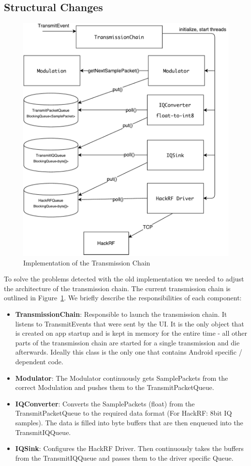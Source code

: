 \subsection{Structural Changes}
\begin{figure}
	\centering
	\includegraphics[width=0.8\linewidth]{gfx/feature1_design.pdf}
	\caption{Implementation of the Transmission Chain}
	\label{fig:impl:transmissionchain}
\end{figure}
To solve the problems detected with the old implementation we needed to adjust the architecture of the transmission chain. The current transmission chain is outlined in Figure~\ref{fig:impl:transmissionchain}. We briefly describe the responsibilities of each component: 

\begin{itemize}
	\item \textbf{TransmissionChain}: Responsible to launch the transmission chain. It listens to TransmitEvents that were sent by the UI. It is the only object that is created on app startup and is kept in memory for the entire time - all other parts of the transmission chain are started for a single transmission and die afterwards. Ideally this class is the only one that contains Android specific / dependent code. 
	\item \textbf{Modulator}: The Modulator continuously gets SamplePackets from the correct Modulation and pushes them to the TransmitPacketQueue. 
	\item \textbf{IQConverter}: Converts the SamplePackets (float) from the TransmitPacketQueue to the required data format (For HackRF: 8bit IQ samples). The data is filled into byte buffers that are then enqueued into the TransmitIQQueue. 
	\item \textbf{IQSink}: Configures the HackRF Driver. Then continuously takes the buffers from the TransmitIQQueue and passes them to the driver specific Queue. 
\end{itemize}

